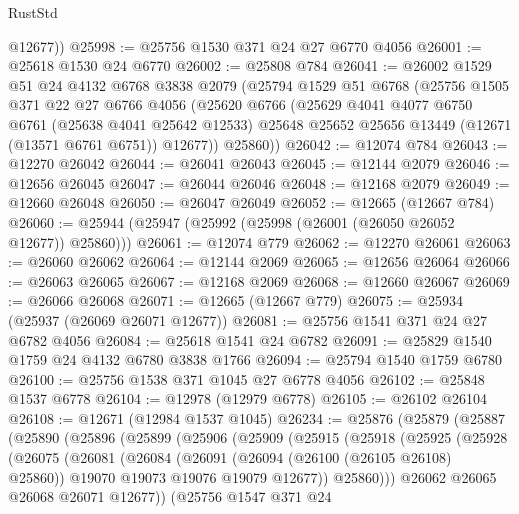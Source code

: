 \begin{lexlean}{RustStd}
\begin{coremodule}
        @12677))
@25998 := @25756 @1530 @371 @24 @27 @6770 @4056
@26001 := @25618 @1530 @24 @6770
@26002 := @25808 @784
@26041 := @26002
    @1529
    @51
    @24
    @4132
    @6768
    @3838
    @2079
    (@25794
      @1529
      @51
      @6768
      (@25756
        @1505
        @371
        @22
        @27
        @6766
        @4056
        (@25620
          @6766
          (@25629
            @4041
            @4077
            @6750
            @6761
            (@25638 @4041 @25642 @12533)
            @25648
            @25652
            @25656
            @13449
            (@12671 (@13571 @6761 @6751))
            @12677))
        @25860))
@26042 := @12074 @784
@26043 := @12270 @26042
@26044 := @26041 @26043
@26045 := @12144 @2079
@26046 := @12656 @26045
@26047 := @26044 @26046
@26048 := @12168 @2079
@26049 := @12660 @26048
@26050 := @26047 @26049
@26052 := @12665 (@12667 @784)
@26060 := @25944 (@25947 (@25992 (@25998 (@26001 (@26050 @26052 @12677)) @25860)))
@26061 := @12074 @779
@26062 := @12270 @26061
@26063 := @26060 @26062
@26064 := @12144 @2069
@26065 := @12656 @26064
@26066 := @26063 @26065
@26067 := @12168 @2069
@26068 := @12660 @26067
@26069 := @26066 @26068
@26071 := @12665 (@12667 @779)
@26075 := @25934 (@25937 (@26069 @26071 @12677))
@26081 := @25756 @1541 @371 @24 @27 @6782 @4056
@26084 := @25618 @1541 @24 @6782
@26091 := @25829 @1540 @1759 @24 @4132 @6780 @3838 @1766
@26094 := @25794 @1540 @1759 @6780
@26100 := @25756 @1538 @371 @1045 @27 @6778 @4056
@26102 := @25848 @1537 @6778
@26104 := @12978 (@12979 @6778)
@26105 := @26102 @26104
@26108 := @12671 (@12984 @1537 @1045)
@26234 := @25876
    (@25879
      (@25887
        (@25890
          (@25896
            (@25899
              (@25906
                (@25909
                  (@25915
                    (@25918
                      (@25925
                        (@25928
                          (@26075
                            (@26081
                              (@26084
                                (@26091
                                  (@26094 (@26100 (@26105 @26108) @25860))
                                  @19070
                                  @19073
                                  @19076
                                  @19079
                                  @12677))
                              @25860)))
                        @26062
                        @26065
                        @26068
                        @26071
                        @12677))
                    (@25756
                      @1547
                      @371
                      @24

\end{coremodule}
\end{lexlean}
